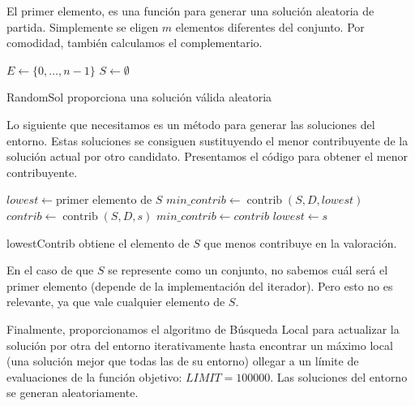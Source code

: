 \documentclass{article}
\begin{document}
El primer elemento, es una función para generar una solución aleatoria de partida. Simplemente se eligen $m$ elementos 
diferentes del conjunto. Por comodidad, también calculamos el complementario.

\begin{algorithm}[H]
	\DontPrintSemicolon %
	$E \gets \{0,\ldots, n-1\}$ 
	$S \gets \emptyset$ 
	\;
	 
	\caption{{\sc RandomSol} proporciona una solución válida aleatoria}
	\label{alg:randomsol}
\end{algorithm}

Lo siguiente que necesitamos es un método para generar las soluciones del entorno. Estas soluciones se consiguen sustituyendo
el menor contribuyente de la solución actual por otro candidato. Presentamos el código para obtener el menor contribuyente.

 \begin{algorithm}[H]
	\DontPrintSemicolon %
	$lowest \gets \text{primer elemento de } S$\;
	$min\_contrib \gets \operatorname{contrib}(S,D,lowest)$\;
	 {
		$contrib \gets \operatorname{contrib}(S,D,s)$\;
		 { 
			$min\_contrib \gets contrib$\;
			$lowest \gets s$ 
		}
	}
	\;
	\;
	\caption{{\sc lowestContrib} obtiene el elemento de $S$ que menos contribuye en la valoración.}
	\label{alg:lowest-contributor}
\end{algorithm}

En el caso de que $S$ se represente como un conjunto, no sabemos cuál será el primer elemento (depende de la implementación del iterador). Pero
esto no es relevante, ya que vale cualquier elemento de $S$.

Finalmente, proporcionamos el algoritmo de Búsqueda Local para actualizar la solución por otra del entorno iterativamente
hasta encontrar un máximo local (una solución mejor que todas las de su entorno) ollegar a un límite de evaluaciones de la función
 objetivo: $LIMIT=100000$. Las soluciones del entorno se generan aleatoriamente.
\end{document}

